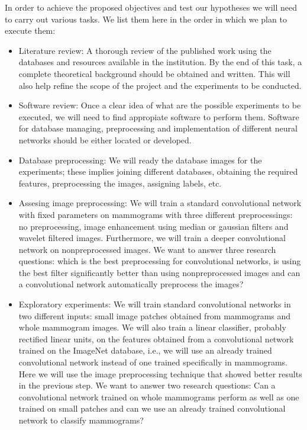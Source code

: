 In order to achieve the proposed objectives and test our hypotheses we will need to carry out various tasks. We list them here in the order in which we plan to execute them:

\begin{itemize}
	\item Literature review: A thorough review of the published work using the databases and resources available in the institution. By the end of this task, a complete theoretical background should be obtained and written. This will also help refine the scope of the project and the experiments to be conducted.
	\item Software review: Once a clear idea of what are the possible experiments to be executed, we will need to find appropiate software to perform them. Software for database managing, preprocessing and implementation of different neural networks should be either located or developed.
	\item Database preprocessing: We will ready the database images for the experiments; these implies joining different databases, obtaining the required features, preprocessing the images, assigning labels, etc.
	\item Assesing image preprocessing: We will train a standard convolutional network with fixed parameters on mammograms with three different preprocessings: no preprocessing, image enhancement using median or gaussian filters and wavelet filtered images. Furthermore, we will train a deeper convolutional network on nonpreprocessed images. We want to answer three research questions: which is the best preprocessing for convolutional networks, is using the best filter significantly better than using nonpreprocessed images and can a convolutional network automatically preprocess the images?
	\item Exploratory experiments: We will train standard convolutional networks in two different inputs: small image patches obtained from mammograms and whole mammogram images. We will also train a linear classifier, probably rectified linear units, on the features obtained from a convolutional network trained on the ImageNet database, i.e., we will use an already trained convolutional network instead of one trained specifically in mammograms. Here we will use the image preprocessing technique that showed better results in the previous step. We want to answer two research questions: Can a convolutional network trained on whole mammograms perform as well as one trained on small patches and can we use an already trained convolutional network to classify mammograms?

\end{itemize}
